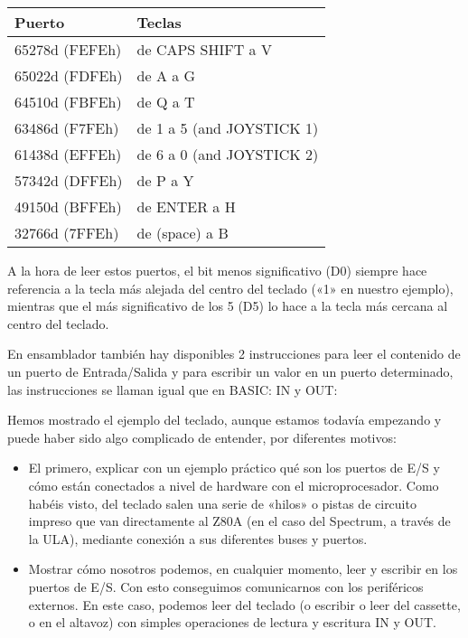 \documentclass[letterpaper,10pt,spanish]{sphinxmanual}
\begin{document}
\begin{savenotes}\sphinxattablestart
\centering
\begin{tabulary}{\linewidth}[t]{|T|T|}
\hline
\sphinxstyletheadfamily 
Puerto
&\sphinxstyletheadfamily 
Teclas
\\
\hline
65278d (FEFEh)
&
de CAPS SHIFT a V
\\
\hline
65022d (FDFEh)
&
de A a G
\\
\hline
64510d (FBFEh)
&
de Q a T
\\
\hline
63486d (F7FEh)
&
de 1 a 5 (and JOYSTICK 1)
\\
\hline
61438d (EFFEh)
&
de 6 a 0 (and JOYSTICK 2)
\\
\hline
57342d (DFFEh)
&
de P a Y
\\
\hline
49150d (BFFEh)
&
de ENTER a H
\\
\hline
32766d (7FFEh)
&
de (space) a B
\\
\hline
\end{tabulary}
\par
\sphinxattableend\end{savenotes}

A la hora de leer estos puertos, el bit menos significativo (D0) siempre hace referencia a la tecla más alejada del centro del teclado («1» en nuestro ejemplo), mientras que el más significativo de los 5 (D5) lo hace a la tecla más cercana al centro del teclado.

En ensamblador también hay disponibles 2 instrucciones para leer el contenido de un puerto de Entrada/Salida y para escribir un valor en un puerto determinado, las instrucciones se llaman igual que en BASIC: IN y OUT:

\begin{sphinxVerbatim}[commandchars=\\\{\}]
  

  
\end{sphinxVerbatim}

Hemos mostrado el ejemplo del teclado, aunque estamos todavía empezando y puede haber sido algo complicado de entender, por diferentes motivos:
\begin{itemize}
\item {} 
El primero, explicar con un ejemplo práctico qué son los puertos de E/S y cómo están conectados a nivel de hardware con el microprocesador. Como habéis visto, del teclado salen una serie de «hilos» o pistas de circuito impreso que van directamente al Z80A (en el caso del Spectrum, a través de la ULA), mediante conexión a sus diferentes buses y puertos.

\item {} 
Mostrar cómo nosotros podemos, en cualquier momento, leer y escribir en los puertos de E/S. Con esto conseguimos comunicarnos con los periféricos externos. En este caso, podemos leer del teclado (o escribir o leer del cassette, o en el altavoz) con simples operaciones de lectura y escritura IN y OUT.

\end{itemize}
\end{document}
